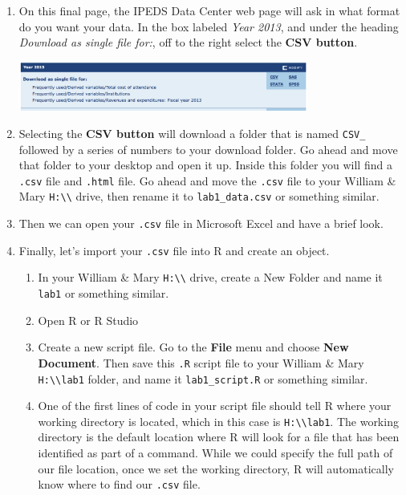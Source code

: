 \documentclass{article}
\newcommand{\code}[1]{\texttt{#1}}
\newcommand{\proglang}[1]{\textsf{#1}}
\begin{document}
{\begin{enumerate}[leftmargin=15mm]
\item On this final page, the IPEDS Data Center web page will ask in what format do you want your data.  In the box labeled \textit{Year 2013}, and under the heading \textit{Download as single file for:}, off to the right select the \textbf{CSV button}.\begin{flushright}\includegraphics[width=0.75\textwidth]{csv.png}\end{flushright}

\item Selecting the \textbf{CSV button} will download a folder that is named \texttt{CSV\_} followed by a series of numbers to your download folder.  Go ahead and move that folder to your desktop and open it up.  Inside this folder you will find a \code{.csv} file and \code{.html} file.  Go ahead and move the \code{.csv} file to your William \& Mary \code{H:\textbackslash\textbackslash} drive, then rename it to \texttt{lab1\_data.csv} or something similar.

\item Then we can open your \code{.csv} file in Microsoft Excel and have a brief look.

\item Finally, let's import your \code{.csv} file into \proglang{R} and create an object.

\begin{enumerate}[label=\Alph*.  ]

\item In your William \& Mary \code{H:\textbackslash\textbackslash} drive, create a New Folder and name it \code{lab1} or something similar.

\item Open \proglang{R} or R Studio

\item Create a new script file.  Go to the \textbf{File} menu and choose \textbf{New Document}.  Then save this \code{.R} script file to your William \& Mary \code{H:\textbackslash\textbackslash}\code{lab1} folder, and name it \texttt{lab1\_script.R} or something similar.

\item One of the first lines of code in your script file should tell \proglang{R} where your working directory is located, which in this case is \code{H:\textbackslash\textbackslash}\code{lab1}.  The working directory is the default location where \proglang{R} will look for a file that has been identified as part of a command.  While we could specify the full path of our file location, once we set the working directory, \proglang{R} will automatically know where to find our \code{.csv} file.


\end{enumerate}
\end{enumerate}}
\end{document}
